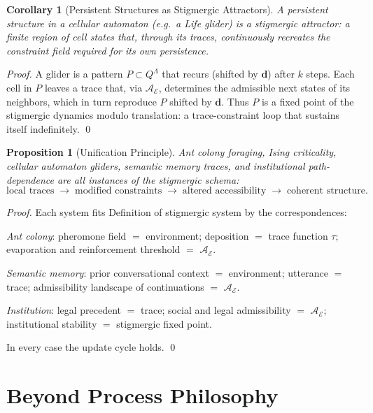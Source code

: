 \documentclass[12pt, a4paper, twoside]{article}
\theoremstyle{plain}
\newtheorem{proposition}[theorem]{Proposition}
\newtheorem{corollary}[theorem]{Corollary}
\theoremstyle{definition}
\theoremstyle{remark}
\newcommand{\Acc}{\mathcal{A}}
\begin{document}
\begin{corollary}[Persistent Structures as Stigmergic Attractors]
\label{cor:glider}
A persistent structure in a cellular automaton (e.g.\ a Life glider) is a
\emph{stigmergic attractor}: a finite region of cell states that, through its
traces, continuously recreates the constraint field required for its own
persistence.
\end{corollary}

\begin{proof}
A glider is a pattern $P \subset Q^\Lambda$ that recurs (shifted by $\mathbf{d}$)
after $k$ steps. Each cell in $P$ leaves a trace that, via $\Acc_\mathcal{E}$,
determines the admissible next states of its neighbors, which in turn reproduce
$P$ shifted by $\mathbf{d}$. Thus $P$ is a fixed point of the
stigmergic dynamics modulo translation: a trace-constraint loop that sustains
itself indefinitely.
\qed
\end{proof}

\begin{proposition}[Unification Principle]
\label{prop:stigmergy_unification}
Ant colony foraging, Ising criticality, cellular automaton gliders, semantic
memory traces, and institutional path-dependence are all instances of the
stigmergic schema:
\[
  \text{local traces} \;\longrightarrow\; \text{modified constraints}
  \;\longrightarrow\; \text{altered accessibility}
  \;\longrightarrow\; \text{coherent structure.}
\]
\end{proposition}

\begin{proof}
Each system fits Definition of stigmergic system by the correspondences:

\emph{Ant colony}: pheromone field $=$ environment; deposition $=$ trace
function $\tau$; evaporation and reinforcement threshold $=$ $\Acc_\mathcal{E}$.

\emph{Semantic memory}: prior conversational context $=$ environment;
utterance $=$ trace; admissibility landscape of continuations $=$ $\Acc_\mathcal{E}$.

\emph{Institution}: legal precedent $=$ trace; social and legal admissibility
$=$ $\Acc_\mathcal{E}$; institutional stability $=$ stigmergic fixed point.

In every case the update cycle holds.
\qed
\end{proof}

\section{Beyond Process Philosophy}
\label{sec:process_philosophy}
\end{document}
